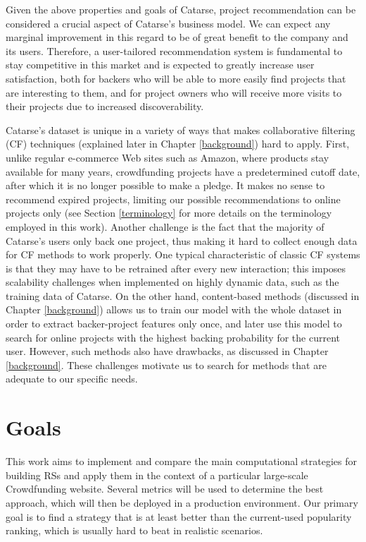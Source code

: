 \documentclass[cic,tc,english]{iiufrgs}
\newcommand{\adriano}[1]{#1}
\begin{document}
Given the above properties and goals of Catarse, project recommendation can be considered a crucial aspect of Catarse's business model. We can expect any marginal improvement in this regard to be of great benefit to the company and its users. Therefore, a user-tailored recommendation system is fundamental to stay competitive in this market and is expected to greatly increase user satisfaction, both for backers who will be able to more easily find projects that are interesting to them, and for project owners who will receive more visits to their projects due to increased discoverability.

Catarse's dataset is unique in a variety of ways that makes collaborative filtering (CF) techniques (explained later in Chapter \ref{background}) hard to apply. First, unlike regular e-commerce Web sites such as Amazon, where products stay available for many years, crowdfunding projects have a predetermined cutoff date, after which it is no longer possible to make a pledge. It makes no sense to recommend expired projects, limiting our possible recommendations to online projects only \adriano{(see Section \ref{terminology} for more details on the terminology employed in this work)}. Another challenge is the fact that the majority of Catarse's users only back one project, thus making it hard to collect enough data for CF methods to work properly. One typical characteristic of classic CF systems is that they may have to be retrained after every new interaction; this imposes scalability challenges when implemented on highly dynamic data, such as the training data of Catarse. On the other hand, content-based methods (discussed in Chapter \ref{background}) allows us to train our model with the whole dataset in order to extract backer-project features only once, and later use this model to search for online projects with the highest backing probability for the current user. However, such methods also have drawbacks, as discussed in Chapter \ref{background}. These challenges motivate us to search for methods that are adequate to our specific needs.

\section{Goals}
This work aims to implement and compare the main computational strategies for building RSs and apply them in the context of a particular large-scale Crowdfunding website. Several metrics will be used to determine the best approach, which will then be deployed in a production environment. Our primary goal is to find a strategy that is at least better than the current-used popularity ranking, which is usually hard to beat in realistic scenarios.
\end{document}
